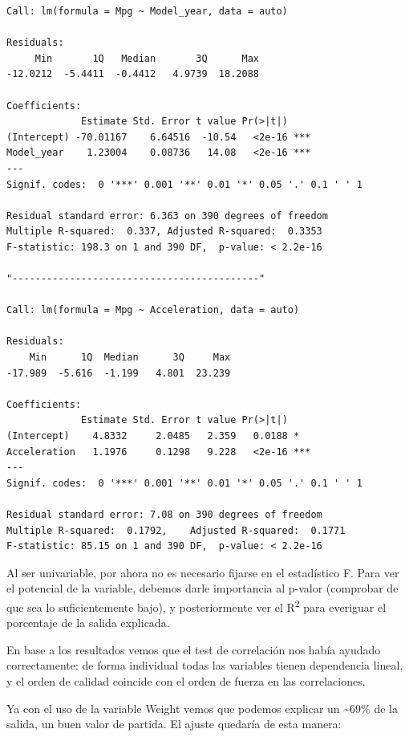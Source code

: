 \begin{verbatim}
Call: lm(formula = Mpg ~ Model_year, data = auto)

Residuals:
     Min       1Q   Median       3Q      Max 
-12.0212  -5.4411  -0.4412   4.9739  18.2088 

Coefficients:
             Estimate Std. Error t value Pr(>|t|)    
(Intercept) -70.01167    6.64516  -10.54   <2e-16 ***
Model_year    1.23004    0.08736   14.08   <2e-16 ***
---
Signif. codes:  0 '***' 0.001 '**' 0.01 '*' 0.05 '.' 0.1 ' ' 1

Residual standard error: 6.363 on 390 degrees of freedom
Multiple R-squared:  0.337, Adjusted R-squared:  0.3353 
F-statistic: 198.3 on 1 and 390 DF,  p-value: < 2.2e-16

"-------------------------------------------"

Call: lm(formula = Mpg ~ Acceleration, data = auto)

Residuals:
    Min      1Q  Median      3Q     Max 
-17.989  -5.616  -1.199   4.801  23.239 

Coefficients:
             Estimate Std. Error t value Pr(>|t|)    
(Intercept)    4.8332     2.0485   2.359   0.0188 *  
Acceleration   1.1976     0.1298   9.228   <2e-16 ***
---
Signif. codes:  0 '***' 0.001 '**' 0.01 '*' 0.05 '.' 0.1 ' ' 1

Residual standard error: 7.08 on 390 degrees of freedom
Multiple R-squared:  0.1792,    Adjusted R-squared:  0.1771 
F-statistic: 85.15 on 1 and 390 DF,  p-value: < 2.2e-16
\end{verbatim}

Al ser univariable, por ahora no es necesario fijarse en el estadístico F. Para ver el potencial de la variable, debemos darle importancia al p-valor (comprobar de que sea lo suficientemente bajo), y posteriormente ver el R\textsuperscript{2} para everiguar el porcentaje de la salida explicada.

\vspace{\baselineskip}

En base a los resultados vemos que el test de correlación nos había ayudado correctamente: de forma individual todas las variables tienen dependencia lineal, y el orden de calidad coincide con el orden de fuerza en las correlaciones.

Ya con el uso de la variable Weight vemos que podemos explicar un \textasciitilde69\% de la salida, un buen valor de partida. El ajuste quedaría de esta manera:


